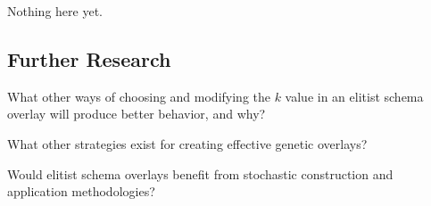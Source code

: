 Nothing here yet.

\subsection*{Further Research}

What other ways of choosing and modifying the $k$ value in an elitist schema overlay will produce better behavior, and why?

What other strategies exist for creating effective genetic overlays?

Would elitist schema overlays benefit from stochastic construction and application methodologies?